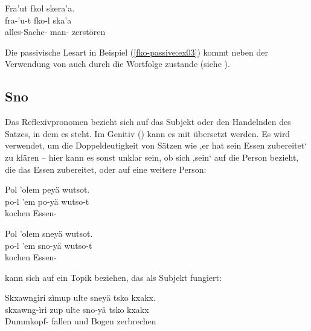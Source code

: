 \begin{interlin} \label{fko-passive:ex03}
	\glll Fra'ut fkol skera'a. \\
	fra-'u-t fko-l ska'a \\
	alles-Sache- man- zerstören \\
\end{interlin}

\noindent Die passivische Lesart in Beispiel (\ref{fko-passive:ex03}) kommt neben der Verwendung von  auch durch die Wortfolge  zustande (siehe ).

\subsection{Sno} 
Das Reflexivpronomen  bezieht sich auf das Subjekt oder den Handelnden des Satzes, in dem es steht. Im Genitiv () kann es mit  übersetzt werden. Es wird verwendet, um die Doppeldeutigkeit von Sätzen wie ,er hat sein Essen zubereitet‘ zu klären -- hier kann es sonst unklar sein, ob sich ,sein‘ auf die Person bezieht, die das Essen zubereitet, oder auf eine weitere Person:

\begin{interlin}
	\glll Pol 'olem peyä wutsot. \\
	po-l 'em po-yä wutso-t \\
	 kochen  Essen- \\
\end{interlin}

\begin{interlin}
	\glll Pol 'olem sneyä wutsot. \\
	po-l 'em sno-yä wutso-t \\
	 kochen  Essen- \\
\end{interlin}

\noindent {} kann sich auf ein Topik beziehen, das als Subjekt fungiert:

\begin{interlin}
	\glll Skxawngìri zìmup ulte sneyä tsko kxakx. \\
	skxawng-ìri zup ulte sno-yä tsko kxakx \\
	Dummkopf- fallen und  Bogen zerbrechen \\
\end{interlin}

